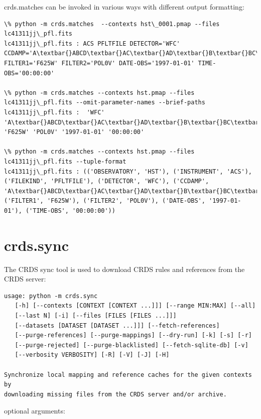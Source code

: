 \documentclass[letterpaper,10pt,english]{sphinxmanual}
\begin{document}
crds.matches can be invoked in various ways with different output formatting:

\begin{Verbatim}[commandchars=\\\{\}]
\% python -m crds.matches  --contexts hst\_0001.pmap --files lc41311jj\_pfl.fits
lc41311jj\_pfl.fits : ACS PFLTFILE DETECTOR='WFC' CCDAMP='A\textbar{}ABCD\textbar{}AC\textbar{}AD\textbar{}B\textbar{}BC\textbar{}BD\textbar{}C\textbar{}D' FILTER1='F625W' FILTER2='POL0V' DATE-OBS='1997-01-01' TIME-OBS='00:00:00'

\% python -m crds.matches --contexts hst.pmap --files lc41311jj\_pfl.fits --omit-parameter-names --brief-paths
lc41311jj\_pfl.fits :  'WFC' 'A\textbar{}ABCD\textbar{}AC\textbar{}AD\textbar{}B\textbar{}BC\textbar{}BD\textbar{}C\textbar{}D' 'F625W' 'POL0V' '1997-01-01' '00:00:00'

\% python -m crds.matches --contexts hst.pmap --files lc41311jj\_pfl.fits --tuple-format
lc41311jj\_pfl.fits : (('OBSERVATORY', 'HST'), ('INSTRUMENT', 'ACS'), ('FILEKIND', 'PFLTFILE'), ('DETECTOR', 'WFC'), ('CCDAMP', 'A\textbar{}ABCD\textbar{}AC\textbar{}AD\textbar{}B\textbar{}BC\textbar{}BD\textbar{}C\textbar{}D'), ('FILTER1', 'F625W'), ('FILTER2', 'POL0V'), ('DATE-OBS', '1997-01-01'), ('TIME-OBS', '00:00:00'))
\end{Verbatim}


\section{crds.sync}
\label{command_line_tools:crds-sync}
The CRDS sync tool is used to download CRDS rules and references from the CRDS server:

\begin{Verbatim}[commandchars=\\\{\}]
usage: python -m crds.sync
   [-h] [--contexts [CONTEXT [CONTEXT ...]]] [--range MIN:MAX] [--all]
   [--last N] [-i] [--files [FILES [FILES ...]]]
   [--datasets [DATASET [DATASET ...]]] [--fetch-references]
   [--purge-references] [--purge-mappings] [--dry-run] [-k] [-s] [-r]
   [--purge-rejected] [--purge-blacklisted] [--fetch-sqlite-db] [-v]
   [--verbosity VERBOSITY] [-R] [-V] [-J] [-H]

Synchronize local mapping and reference caches for the given contexts by
downloading missing files from the CRDS server and/or archive.
\end{Verbatim}

optional arguments:
\end{document}
